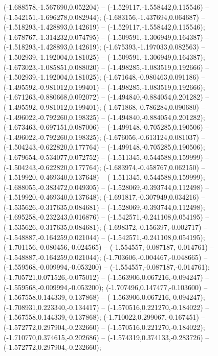  (-1.688578,-1.567690,0.052204) -- (-1.529117,-1.558442,0.115546) -- (-1.542151,-1.696278,0.082944);
 (-1.683156,-1.437694,0.064687) -- (-1.518293,-1.428893,0.142619) -- (-1.529117,-1.558442,0.115546);
 (-1.678767,-1.314232,0.074795) -- (-1.509591,-1.306949,0.164387) -- (-1.518293,-1.428893,0.142619);
 (-1.675393,-1.197033,0.082563) -- (-1.502939,-1.192004,0.181025) -- (-1.509591,-1.306949,0.164387);
 (-1.673023,-1.085851,0.088020) -- (-1.498285,-1.083519,0.192666) -- (-1.502939,-1.192004,0.181025);
 (-1.671648,-0.980463,0.091186) -- (-1.495592,-0.981012,0.199401) -- (-1.498285,-1.083519,0.192666);
 (-1.671263,-0.880668,0.092072) -- (-1.494840,-0.884054,0.201282) -- (-1.495592,-0.981012,0.199401);
 (-1.671868,-0.786284,0.090680) -- (-1.496022,-0.792260,0.198325) -- (-1.494840,-0.884054,0.201282);
 (-1.673463,-0.697151,0.087006) -- (-1.499148,-0.705285,0.190506) -- (-1.496022,-0.792260,0.198325);
 (-1.676056,-0.613124,0.081037) -- (-1.504243,-0.622820,0.177764) -- (-1.499148,-0.705285,0.190506);
 (-1.679654,-0.534077,0.072752) -- (-1.511345,-0.544588,0.159999) -- (-1.504243,-0.622820,0.177764);
 (-1.683974,-0.458767,0.062150) -- (-1.519920,-0.469340,0.137648) -- (-1.511345,-0.544588,0.159999);
 (-1.688055,-0.383472,0.049305) -- (-1.528069,-0.393744,0.112498) -- (-1.519920,-0.469340,0.137648);
 (-1.691817,-0.307949,0.034216) -- (-1.535626,-0.317635,0.084681) -- (-1.528069,-0.393744,0.112498);
 (-1.695258,-0.232243,0.016876) -- (-1.542571,-0.241108,0.054195) -- (-1.535626,-0.317635,0.084681);
 (-1.698372,-0.156397,-0.002717) -- (-1.548887,-0.164259,0.021044) -- (-1.542571,-0.241108,0.054195);
 (-1.701156,-0.080456,-0.024565) -- (-1.554557,-0.087187,-0.014761) -- (-1.548887,-0.164259,0.021044);
 (-1.703606,-0.004467,-0.048665) -- (-1.559568,-0.009994,-0.053200) -- (-1.554557,-0.087187,-0.014761);
 (-1.705721,0.071526,-0.075012) -- (-1.563906,0.067216,-0.094247) -- (-1.559568,-0.009994,-0.053200);
 (-1.707496,0.147477,-0.103600) -- (-1.567558,0.144339,-0.137868) -- (-1.563906,0.067216,-0.094247);
 (-1.708931,0.223340,-0.134417) -- (-1.570516,0.221270,-0.184022) -- (-1.567558,0.144339,-0.137868);
 (-1.710022,0.299067,-0.167451) -- (-1.572772,0.297904,-0.232660) -- (-1.570516,0.221270,-0.184022);
 (-1.710770,0.374615,-0.202686) -- (-1.574319,0.374133,-0.283726) -- (-1.572772,0.297904,-0.232660);
